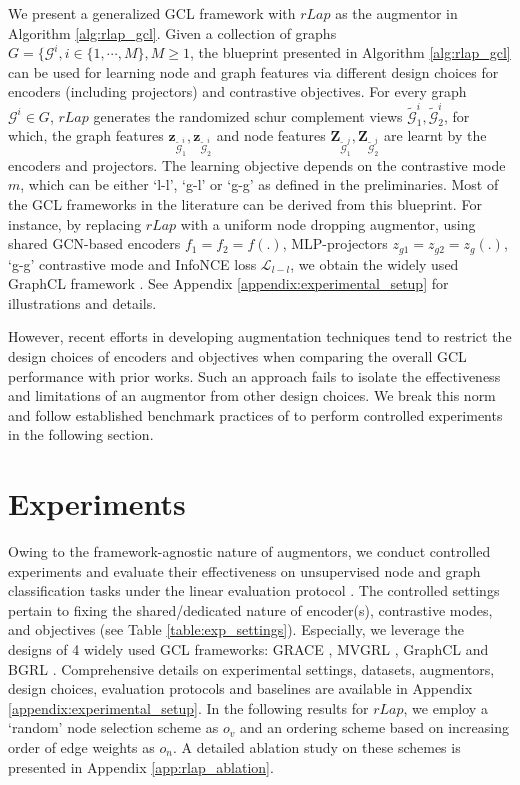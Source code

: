 \documentclass{article}
\def\mZ{{\mathbf{Z}}}
\def\vz{{\mathbf{z}}}
\def\gG{{\mathcal{G}}}
\theoremstyle{plain}
\theoremstyle{definition}
\theoremstyle{remark}
\begin{document}
We present a generalized GCL framework with $rLap$ as the augmentor in Algorithm \ref{alg:rlap_gcl}. Given a collection of graphs $G = \{\gG^i, i \in \{1, \cdots, M\}, M \ge 1$, the blueprint presented in Algorithm \ref{alg:rlap_gcl} can be used for learning node and graph features via different design choices for encoders (including projectors) and contrastive objectives. For every graph $\gG^i \in G$, $rLap$ generates the randomized schur complement views $\widetilde{\gG}^{i}_1, \widetilde{\gG}^{i}_2$, for which, the graph features $\vz_{\widetilde{\gG}^{i}_1}, \vz_{\widetilde{\gG}^{i}_2}$ and node features $\mZ_{\widetilde{\gG}^{j}_1}, \mZ_{\widetilde{\gG}^{j}_2}$ are learnt by the encoders and projectors. The learning objective depends on the contrastive mode $m$, which can be either `l-l', `g-l' or `g-g' as defined in the preliminaries. Most of the GCL frameworks in the literature can be derived from this blueprint. For instance, by replacing $rLap$ with a uniform node dropping augmentor, using shared GCN-based encoders $f_1=f_2=f(.)$, MLP-projectors $z_{g1}=z_{g2}=z_g(.)$, `g-g' contrastive mode and InfoNCE loss $\mathcal{L}_{l-l}$, we obtain the widely used GraphCL framework \citep{you2020graph}. See Appendix \ref{appendix:experimental_setup} for illustrations and details.

However, recent efforts in developing augmentation techniques tend to restrict the design choices of encoders and objectives when comparing the overall GCL performance with prior works. Such an approach fails to isolate the effectiveness and limitations of an augmentor from other design choices. We break this norm and follow established benchmark practices of \citet{zhu2021empirical} to perform controlled experiments in the following section.

\section{Experiments}

Owing to the framework-agnostic nature of augmentors, we conduct controlled experiments and evaluate their effectiveness on unsupervised node and graph classification tasks under the linear evaluation protocol \citep{velickovic2019deep}. The controlled settings pertain to fixing the shared/dedicated nature of encoder(s), contrastive modes, and objectives (see Table \ref{table:exp_settings}). Especially, we leverage the designs of 4 widely used GCL frameworks: GRACE \citep{zhu2020deep}, MVGRL \citep{hassani2020contrastive}, GraphCL \citep{you2020graph} and BGRL \citep{thakoor2021bootstrapped}. Comprehensive details on experimental settings, datasets, augmentors, design choices, evaluation protocols  and baselines are available in Appendix \ref{appendix:experimental_setup}. In the following results for $rLap$, we employ a `random' node selection scheme as $o_v$ and an ordering scheme based on increasing order of edge weights as $o_n$. A detailed ablation study on these schemes is presented in Appendix \ref{app:rlap_ablation}.
\end{document}
